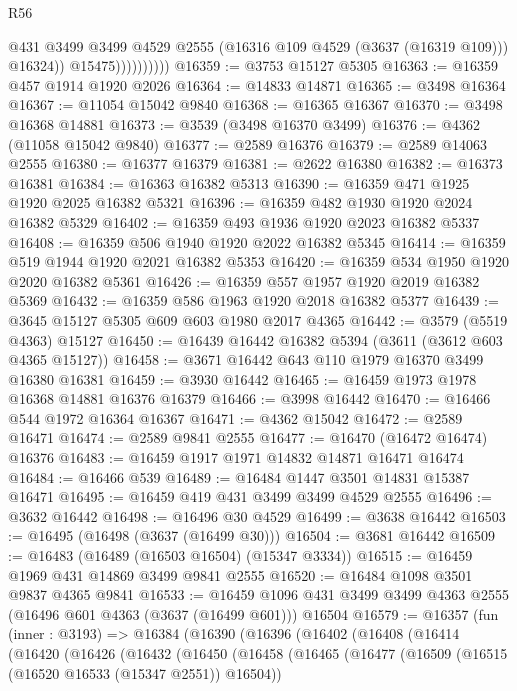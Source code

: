 \begin{lexlean}{R56}
\begin{coremodule}
                            @431
                            @3499
                            @3499
                            @4529
                            @2555
                            (@16316 @109 @4529 (@3637 (@16319 @109)))
                            @16324))
                        @15475))))))))))
@16359 := @3753 @15127 @5305
@16363 := @16359 @457 @1914 @1920 @2026
@16364 := @14833 @14871
@16365 := @3498 @16364
@16367 := @11054 @15042 @9840
@16368 := @16365 @16367
@16370 := @3498 @16368 @14881
@16373 := @3539 (@3498 @16370 @3499)
@16376 := @4362 (@11058 @15042 @9840)
@16377 := @2589 @16376
@16379 := @2589 @14063 @2555
@16380 := @16377 @16379
@16381 := @2622 @16380
@16382 := @16373 @16381
@16384 := @16363 @16382 @5313
@16390 := @16359 @471 @1925 @1920 @2025 @16382 @5321
@16396 := @16359 @482 @1930 @1920 @2024 @16382 @5329
@16402 := @16359 @493 @1936 @1920 @2023 @16382 @5337
@16408 := @16359 @506 @1940 @1920 @2022 @16382 @5345
@16414 := @16359 @519 @1944 @1920 @2021 @16382 @5353
@16420 := @16359 @534 @1950 @1920 @2020 @16382 @5361
@16426 := @16359 @557 @1957 @1920 @2019 @16382 @5369
@16432 := @16359 @586 @1963 @1920 @2018 @16382 @5377
@16439 := @3645 @15127 @5305 @609 @603 @1980 @2017 @4365
@16442 := @3579 (@5519 @4363) @15127
@16450 := @16439 @16442 @16382 @5394 (@3611 (@3612 @603 @4365 @15127))
@16458 := @3671 @16442 @643 @110 @1979 @16370 @3499 @16380 @16381
@16459 := @3930 @16442
@16465 := @16459 @1973 @1978 @16368 @14881 @16376 @16379
@16466 := @3998 @16442
@16470 := @16466 @544 @1972 @16364 @16367
@16471 := @4362 @15042
@16472 := @2589 @16471
@16474 := @2589 @9841 @2555
@16477 := @16470 (@16472 @16474) @16376
@16483 := @16459 @1917 @1971 @14832 @14871 @16471 @16474
@16484 := @16466 @539
@16489 := @16484 @1447 @3501 @14831 @15387 @16471
@16495 := @16459 @419 @431 @3499 @3499 @4529 @2555
@16496 := @3632 @16442
@16498 := @16496 @30 @4529
@16499 := @3638 @16442
@16503 := @16495 (@16498 (@3637 (@16499 @30)))
@16504 := @3681 @16442
@16509 := @16483 (@16489 (@16503 @16504) (@15347 @3334))
@16515 := @16459 @1969 @431 @14869 @3499 @9841 @2555
@16520 := @16484 @1098 @3501 @9837 @4365 @9841
@16533 := @16459 @1096 @431 @3499 @3499 @4363 @2555 (@16496 @601 @4363 (@3637 (@16499 @601))) @16504
@16579 := @16357
    (fun (inner : @3193) =>
    @16384
      (@16390
        (@16396
          (@16402
            (@16408
              (@16414
                (@16420
                  (@16426
                    (@16432
                      (@16450
                        (@16458
                          (@16465
                            (@16477
                              (@16509 (@16515 (@16520 @16533 (@15347 @2551)) @16504))

\end{coremodule}
\end{lexlean}
